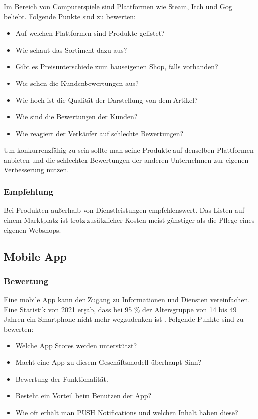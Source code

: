 Im Bereich von Computerspiele sind Plattformen wie Steam, Itch und Gog beliebt. Folgende Punkte sind zu bewerten:

\begin{itemize}
\item Auf welchen Plattformen sind Produkte gelistet?
\item Wie schaut das Sortiment dazu aus?
\item Gibt es Preisunterschiede zum hauseigenen Shop, falls vorhanden?
\item Wie sehen die Kundenbewertungen aus?
\item Wie hoch ist die Qualität der Darstellung von dem Artikel?
\item Wie sind die Bewertungen der Kunden?
\item Wie reagiert der Verkäufer auf schlechte Bewertungen?
\end{itemize}

Um konkurrenzfähig zu sein sollte man seine Produkte auf denselben Plattformen anbieten und die schlechten Bewertungen der anderen Unternehmen zur eigenen Verbesserung nutzen.

\subsubsection*{Empfehlung}
Bei Produkten außerhalb von Dienstleistungen empfehlenswert. Das Listen auf einem Marktplatz ist trotz zusätzlicher Kosten meist günstiger als die Pflege eines eigenen Webshops.

\subsection{Mobile App}
\subsubsection*{Bewertung}
Eine mobile App kann den Zugang zu Informationen und Diensten vereinfachen. Eine Statistik von 2021 ergab, dass bei 95 \% der Altersgruppe von 14 bis 49 Jahren ein Smartphone nicht mehr wegzudenken ist \cite{smartphonenutzer}. Folgende Punkte sind zu bewerten:

\begin{itemize}
\item Welche App Stores werden unterstützt?
\item Macht eine App zu diesem Geschäftsmodell überhaupt Sinn?
\item Bewertung der Funktionalität.
\item Besteht ein Vorteil beim Benutzen der App?
\item Wie oft erhält man PUSH Notifications und welchen Inhalt haben diese?
\end{itemize}

